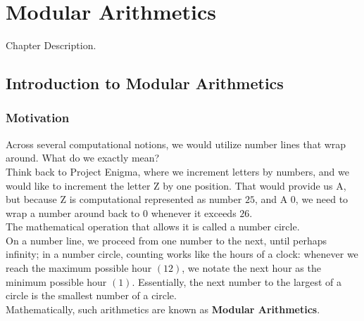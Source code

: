 \chapter{Modular Arithmetics}
Chapter Description.

\section{Introduction to Modular Arithmetics}

\subsection{Motivation}
Across several computational notions, we would utilize number lines that wrap around. What do we exactly mean? \\
Think back to Project Enigma, where we increment letters by numbers, and we would like to increment the letter Z by one position. That would provide us A, but because Z is computational represented as number $25$, and A $0$, we need to wrap a number around back to $0$ whenever it exceeds $26$. \\
The mathematical operation that allows it is called a number circle. \\
On a number line, we proceed from one number to the next, until perhaps infinity; in a number circle, counting works like the hours of a clock: whenever we reach the maximum possible hour $(12)$, we notate the next hour as the minimum possible hour $(1)$. Essentially, the next number to the largest of a circle is the smallest number of a circle. \\
Mathematically, such arithmetics are known as \textbf{Modular Arithmetics}.

